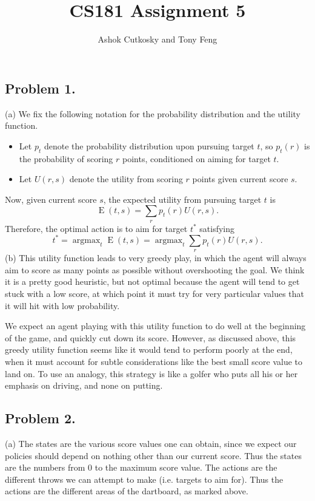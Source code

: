 \documentclass[12pt]{article}
\title{CS181 Assignment 5}
\author{Ashok Cutkosky and Tony Feng}
\DeclareMathOperator{\argmax}{argmax}
\DeclareMathOperator{\E}{E}
\theoremstyle{remark}
\begin{document}
\maketitle

\subsection*{Problem 1.} (a) We fix the following notation for the probability distribution and the utility function. 
\begin{itemize}
\item Let $p_t$ denote the probability distribution upon pursuing target $t$, so $p_t(r)$ is the probability of scoring $r$ points, conditioned on aiming for target $t$. 
\item Let $U(r, s)$ denote the utility from scoring $r$ points given current score $s$. 
\end{itemize} 
Now, given current score $s$, the expected utility from pursuing target $t$ is 
\[
\E(t,s) = \sum_r p_t(r) U(r,s).
\]
Therefore, the optimal action is to aim for target $t^*$ satisfying 
\[
t^* = \displaystyle\argmax_t \E(t,s) = \argmax_t \sum_r p_t(r) U(r,s).
\]
(b) This utility function leads to very greedy play, in which the agent will always aim to score as many points as possible without overshooting the goal. We think it is a pretty good heuristic, but not optimal because the agent will tend to get stuck with a low score, at which point it must try for very particular values that it will hit with low probability. 

We expect an agent playing with this utility function to do well at the beginning of the game, and quickly cut down its score. However, as discussed above, this greedy utility function seems like it would tend to perform poorly at the end, when it must account for subtle considerations like the best small score value to land on. To use an analogy, this strategy is like a golfer who puts all his or her emphasis on driving, and none on putting. \\

\subsection*{Problem 2.} (a) The states are the various score values one can obtain, since we expect our policies should depend on nothing other than our current score. Thus the states are the numbers from $0$ to the maximum score value. The actions are the different throws we can attempt to make (i.e. targets to aim for). Thus the actions are the different areas of the dartboard, as marked above.\\
\end{document}
